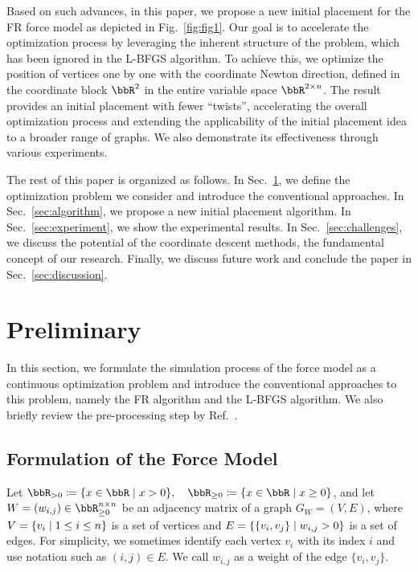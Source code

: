 \documentclass[dvipdfmx,10pt,journal,compsoc]{IEEEtran}
\newcommand{\defeq}{\coloneqq}
\begin{document}
Based on such advances, in this paper, we propose a new initial placement for the FR force model as depicted in Fig.~\ref{fig:fig1}.
Our goal is to accelerate the optimization process by leveraging the inherent structure of the problem, which has been ignored in the L-BFGS algorithm.
To achieve this, we optimize the position of vertices one by one with the coordinate Newton direction, defined in the coordinate block $\bbR^2$ in the entire variable space $\bbR^{2 \times n}$.
The result provides an initial placement with fewer ``twists'', accelerating the overall optimization process and extending the applicability of the initial placement idea to a broader range of graphs.
We also demonstrate its effectiveness through various experiments.

The rest of this paper is organized as follows.
In Sec.~\ref{sec:preliminary}, we define the optimization problem we consider and introduce the conventional approaches.
In Sec.~\ref{sec:algorithm}, we propose a new initial placement algorithm.
In Sec.~\ref{sec:experiment}, we show the experimental results.
In Sec.~\ref{sec:challenges}, we discuss the potential of the coordinate descent methods, the fundamental concept of our research.
Finally, we discuss future work and conclude the paper in Sec.~\ref{sec:discussion}.

\section{Preliminary}\label{sec:preliminary}

In this section, we formulate the simulation process of the force model as a continuous optimization problem and introduce the conventional approaches to this problem, namely the FR algorithm and the L-BFGS algorithm. We also briefly review the pre-processing step by Ref.~\cite{ghassemitoosiSimulatedAnnealingPreProcessing2016}.

\subsection{Formulation of the Force Model}\label{ssec:forceModel}

Let $\bbR_{> 0} \defeq \qty{ x \in \bbR \mid x > 0 }, \quad \bbR_{\geq 0} \defeq \qty{ x \in \bbR \mid x \geq 0 }$, and let $W = (w_{i,j}) \in \bbR_{\geq 0}^{n \times n}$ be an adjacency matrix of a graph $G_W = (V, E)$, where $V = \qty{v_i \mid 1 \leq i \leq n}$ is a set of vertices and $E = \qty{\{v_i, v_j\} \mid w_{i,j} > 0}$ is a set of edges.
For simplicity, we sometimes identify each vertex $v_i$ with its index $i$ and use notation such as $(i, j) \in E$.
We call $w_{i,j}$ as a weight of the edge $\{v_i,v_j\}$.
\end{document}

